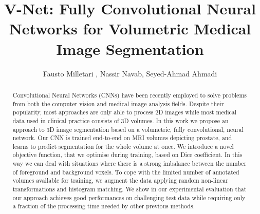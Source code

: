 \documentclass{llncs}
\begin{document}
\frontmatter          \pagestyle{headings}  \mainmatter              \title{V-Net: Fully Convolutional Neural Networks for Volumetric Medical Image Segmentation}



\author{Fausto Milletari ,
	Nassir Navab,
	Seyed-Ahmad Ahmadi 
}



\maketitle              


\begin{abstract}
Convolutional Neural Networks (CNNs) have been recently employed to solve problems from both the computer vision and medical image analysis fields. Despite their popularity, most approaches are only able to process 2D images while most medical data used in clinical practice consists of 3D volumes. In this work we propose an approach to 3D image segmentation based on a volumetric, fully convolutional, neural network. Our CNN is trained end-to-end on MRI volumes depicting prostate, and learns to predict segmentation for the whole volume at once. We introduce a novel objective function, that we optimise during training, based on Dice coefficient. In this way we can deal with situations where there is a strong imbalance between the number of foreground and background voxels. To cope with the limited number of annotated volumes available for training, we augment the data applying random non-linear transformations and histogram matching. We show in our experimental evaluation that our approach achieves good performances on challenging test data while requiring only a fraction of the processing time needed by other previous methods.
\end{abstract}
\end{document}
